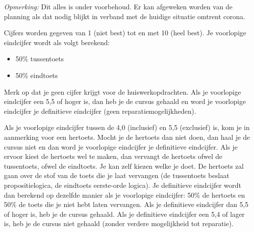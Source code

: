 \documentclass[a4paper,11pt]{article}
\begin{document}

\emph{Opmerking:} Dit alles is onder voorbehoud. Er kan afgeweken worden van de planning als dat nodig blijkt in verband met de huidige situatie omtrent corona.

Cijfers worden gegeven van 1 (niet best) tot en met 10 (heel best). Je voorlopige eindcijfer wordt als volgt berekend:

\begin{itemize}
    \item 50\% tussentoets
    \item 50\% eindtoets
\end{itemize}






Merk op dat je geen cijfer krijgt voor de huiswerkopdrachten. Als je voorlopige eindcijfer een 5,5 of hoger is, dan heb je de cursus gehaald en word je voorlopige eindcijfer je definitieve eindcijfer (geen reparatiemogelijkheden).

Als je voorlopige eindcijfer tussen de 4,0 (inclusief) en 5,5 (exclusief) is, kom je in aanmerking voor een hertoets.
Mocht je de hertoets dan niet doen, dan haal je de cursus niet en dan word je voorlopige eindcijfer je definitieve eindcijfer.
Als je ervoor kiest de hertoets wel te maken, dan vervangt de hertoets ofwel de tussentoets, ofwel de eindtoets.
Je kan zelf kiezen welke je doet.
De hertoets zal gaan over de stof van de toets die je laat vervangen (de tussentoets beslaat propositielogica, de eindtoets eerste-orde logica).
Je definitieve eindcijfer wordt dan berekend op dezelfde manier als je voorlopige eindcijfer: 50\% de hertoets en 50\% de toets die je niet hebt laten vervangen.
Als je definitieve eindcijfer dan 5,5 of hoger is, heb je de cursus gehaald.
Als je definitieve eindcijfer een 5,4 of lager is, heb je de cursus niet gehaald (zonder verdere mogelijkheid tot reparatie).  
\end{document}

